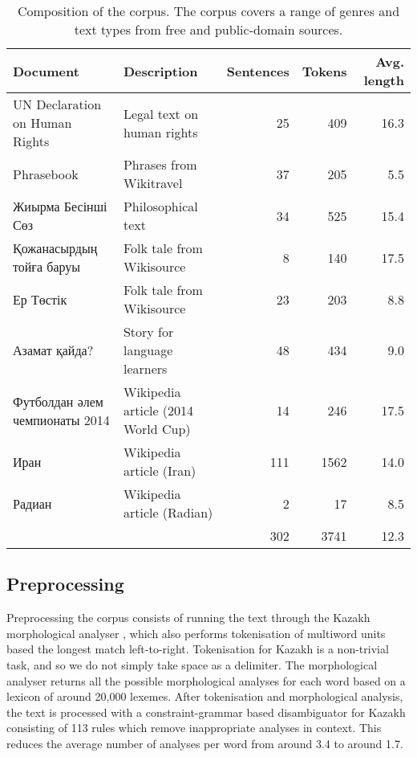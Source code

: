 \documentclass[a4paper,11pt, onecolumn,twoside]{article}
\begin{document}
\begin{table}[htbp]
  \centering
\begin{small}
  \begin{tabular}{llrrr}
    \toprule
	    \textbf{Document} & \textbf{Description} & \textbf{Sentences} & \textbf{Tokens} & \textbf{Avg. length}\\
    \midrule
	    UN Declaration on Human Rights & Legal text on human rights & 25 & 409 & 16.3 \\
	    Phrasebook                     & Phrases from Wikitravel   & 37 & 205 & 5.5 \\
	    Жиырма Бесінші Сөз             & Philosophical text        & 34 & 525 & 15.4 \\ 
	    Қожанасырдың тойға баруы       & Folk tale from Wikisource  & 8 & 140 & 17.5 \\
	    Ер Төстік                      & Folk tale from Wikisource  & 23 & 203 & 8.8 \\
	    Азамат қайда?                  & Story for language learners & 48 & 434 & 9.0 \\
	    Футболдан әлем чемпионаты 2014 & Wikipedia article (2014 World Cup) & 14 & 246 & 17.5 \\
	    Иран & Wikipedia article (Iran)                                & 111 & 1562 & 14.0 \\
	    Радиан & Wikipedia article (Radian)                            & 2 & 17 & 8.5 \\
    \midrule
	    \multicolumn{2}{c}{~} & 302 & 3741 & 12.3 \\\cmidrule[\heavyrulewidth]{3-5}
  \end{tabular}
\end{small}
  \caption{Composition of the corpus. The corpus covers a range of genres and text types from 
    free and public-domain sources.}
\end{table}


\subsection{Preprocessing}

Preprocessing the corpus consists of running the text through the Kazakh morphological
analyser \parencite{Washington14}, which also performs tokenisation of multiword units based 
the longest match left-to-right. Tokenisation for Kazakh is a non-trivial task, and so
we do not simply take space as a delimiter. The morphological analyser returns all 
the possible morphological analyses for each word based on a lexicon of around 20,000 lexemes.
After tokenisation and morphological analysis, the text is processed with a constraint-grammar 
based disambiguator for Kazakh consisting of 113 rules which remove inappropriate 
analyses in context. This reduces the average number of analyses per word from around 3.4
to around 1.7.
\end{document}
